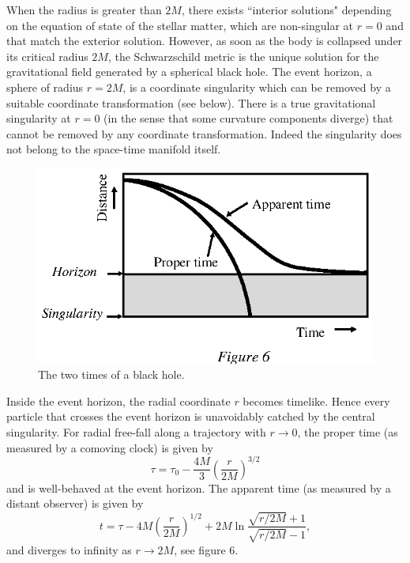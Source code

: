 \documentclass{lamuphys}
\begin{document}
When the radius is greater than $2M$, there exists ``interior solutions"
depending on the equation of state of the stellar matter, which are
non-singular at $r=0$ and that match the exterior solution.  However,
as soon as the body is collapsed under its critical radius $2M$, the
Schwarzschild metric is the unique solution for the gravitational
field generated by a spherical black hole. The event horizon, a sphere of radius
$r=2M$, is a coordinate singularity which can be removed by a suitable
coordinate transformation (see below). There is a true gravitational
singularity at $r=0$ (in the sense that some curvature components diverge) that
cannot be removed by any coordinate transformation. Indeed the singularity does
not belong to the space-time manifold itself. 
\begin{figure}[tb]
  \begin{center}
    \leavevmode
    \includegraphics{time.ps}
    \caption{The two times of a black hole.}
  \end{center}
\end{figure}
Inside the event horizon, the radial coordinate $r$ becomes timelike. Hence
every particle that crosses the event horizon is unavoidably catched by the
central singularity. For radial free-fall along a trajectory with  $r
\rightarrow 0 $, the proper time (as measured by a comoving clock) is given by 
\begin{equation}
\tau =  \tau_0 - \frac{4M}{3}\left(\frac{r}{2M}\right)^{3/2}
\end{equation}
and is well-behaved at the event horizon.
 The apparent time (as measured by a distant observer) is given by  
\begin{equation}
t = \tau - 4M\left(\frac{r}{2M}\right)^{1/2}
+ 2M \ln\frac{\sqrt{r/2M}+1}{\sqrt{r/2M}-1},
\end{equation}
and diverges to infinity as $r \to 2M$, see figure 6.
\end{document}
